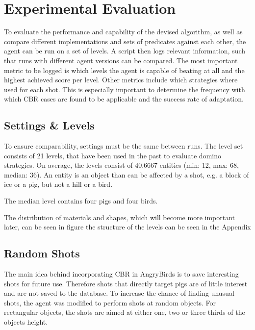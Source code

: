 \section{Experimental Evaluation}\label{sec:experimental}
To evaluate the performance and capability of the devised algorithm, as well as compare different implementations and sets of predicates against each other, the agent can be run on a set of levels.
A script then logs relevant information, such that runs with different agent versions can be compared.
The most important metric to be logged is which levels the agent is capable of beating at all and the highest achieved score per level.
Other metrics include which strategies where used for each shot.
This is especially important to determine the frequency with which \acs{CBR} cases are found to be applicable and the success rate of adaptation.



\subsection{Settings \& Levels}\label{subsec:experimental-settings}
To ensure comparability, settings must be the same between runs.
The level set consists of 21 levels, that have been used in the past to evaluate domino strategies. On average, the levels consist of 40.6667 entities (min: 12, max: 68, median: 36). An entity is an object than can be affected by a shot, e.g. a block of ice or a pig, but not a hill or a bird.

The median level contains four pigs and four birds.

The distribution of materials and shapes, which will become more important later, can be seen in figure %
the structure of the levels can be seen in the Appendix %




\subsection{Random Shots}
The main idea behind incorporating CBR in AngryBirds is to save interesting shots for future use. Therefore shots that directly target pigs are of little interest and are not saved to the database.
To increase the chance of finding unusual shots, the agent was modified to perform shots at random objects. For rectangular objects, the shots are aimed at either one, two or three thirds of the objects height.

